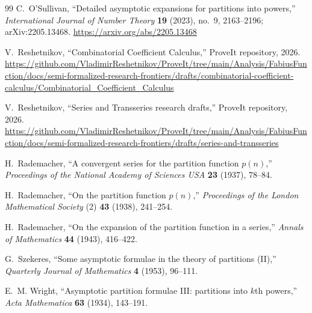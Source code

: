 \documentclass[11pt,a4paper]{article}
\numberwithin{equation}{section}
\theoremstyle{remark}
\begin{document}
\begin{thebibliography}{99}
C.~O'Sullivan,
``Detailed asymptotic expansions for partitions into powers,''
\emph{International Journal of Number Theory} \textbf{19} (2023), no.~9, 2163--2196;
arXiv:2205.13468.
\url{https://arxiv.org/abs/2205.13468}

V.~Reshetnikov,
``Combinatorial Coefficient Calculus,''
ProveIt repository, 2026.
\url{https://github.com/VladimirReshetnikov/ProveIt/tree/main/Analysis/FabiusFunction/docs/semi-formalized-research-frontiers/drafts/combinatorial-coefficient-calculus/Combinatorial_Coefficient_Calculus}

V.~Reshetnikov,
``Series and Transseries research drafts,''
ProveIt repository, 2026.
\url{https://github.com/VladimirReshetnikov/ProveIt/tree/main/Analysis/FabiusFunction/docs/semi-formalized-research-frontiers/drafts/series-and-transseries}

H.~Rademacher,
``A convergent series for the partition function $p(n)$,''
\emph{Proceedings of the National Academy of Sciences USA} \textbf{23} (1937), 78--84.

H.~Rademacher,
``On the partition function $p(n)$,''
\emph{Proceedings of the London Mathematical Society} (2) \textbf{43} (1938), 241--254.

H.~Rademacher,
``On the expansion of the partition function in a series,''
\emph{Annals of Mathematics} \textbf{44} (1943), 416--422.

G.~Szekeres,
``Some asymptotic formulae in the theory of partitions (II),''
\emph{Quarterly Journal of Mathematics} \textbf{4} (1953), 96--111.

E.~M. Wright,
``Asymptotic partition formulae III: partitions into $k$th powers,''
\emph{Acta Mathematica} \textbf{63} (1934), 143--191.

\end{thebibliography}
\end{document}

